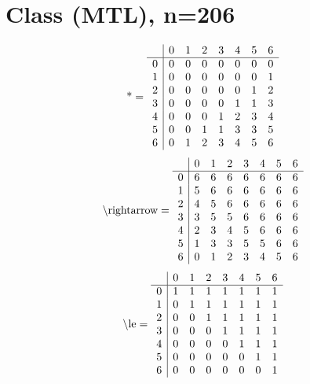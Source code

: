 \documentclass[11pt]{article}
\begin{document}
\section{Class (MTL), n=206}
\[\text{*} = 
\begin{array}{r | r r r r r r r}
 & 0 & 1 & 2 & 3 & 4 & 5 & 6 \\ \hline
0 & 0 & 0 & 0 & 0 & 0 & 0 & 0 \\
1 & 0 & 0 & 0 & 0 & 0 & 0 & 1 \\
2 & 0 & 0 & 0 & 0 & 0 & 1 & 2 \\
3 & 0 & 0 & 0 & 0 & 1 & 1 & 3 \\
4 & 0 & 0 & 0 & 1 & 2 & 3 & 4 \\
5 & 0 & 0 & 1 & 1 & 3 & 3 & 5 \\
6 & 0 & 1 & 2 & 3 & 4 & 5 & 6 \\
\end{array}
\]
\[\text{\textbackslash rightarrow} = 
\begin{array}{r | r r r r r r r}
 & 0 & 1 & 2 & 3 & 4 & 5 & 6 \\ \hline
0 & 6 & 6 & 6 & 6 & 6 & 6 & 6 \\
1 & 5 & 6 & 6 & 6 & 6 & 6 & 6 \\
2 & 4 & 5 & 6 & 6 & 6 & 6 & 6 \\
3 & 3 & 5 & 5 & 6 & 6 & 6 & 6 \\
4 & 2 & 3 & 4 & 5 & 6 & 6 & 6 \\
5 & 1 & 3 & 3 & 5 & 5 & 6 & 6 \\
6 & 0 & 1 & 2 & 3 & 4 & 5 & 6 \\
\end{array}
\]
\[\text{\textbackslash le} = 
\begin{array}{r | r r r r r r r}
 & 0 & 1 & 2 & 3 & 4 & 5 & 6 \\ \hline
0 & 1 & 1 & 1 & 1 & 1 & 1 & 1 \\
1 & 0 & 1 & 1 & 1 & 1 & 1 & 1 \\
2 & 0 & 0 & 1 & 1 & 1 & 1 & 1 \\
3 & 0 & 0 & 0 & 1 & 1 & 1 & 1 \\
4 & 0 & 0 & 0 & 0 & 1 & 1 & 1 \\
5 & 0 & 0 & 0 & 0 & 0 & 1 & 1 \\
6 & 0 & 0 & 0 & 0 & 0 & 0 & 1 \\
\end{array}
\]
\end{document}
